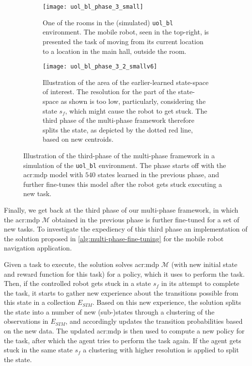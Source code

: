 \begin{figure}
	\centering
	\captionsetup{font=small}
	\captionsetup[subfigure]{font=footnotesize}
	\begin{subfigure}{0.475\textwidth}
		\centering
		\texttt{[image: uol\_bl\_phase\_3\_small]}
		\caption{One of the rooms in the (simulated) \texttt{uol\_bl} environment. The mobile robot, seen in the top-right, is presented the task of moving from its current location to a location in the main hall, outside the room.}
		\label{fig:uol_bl_tuning_1}
	\end{subfigure}
	\hfill
	\begin{subfigure}{0.475\textwidth}
		\centering
		\vspace{19.5pt}
		\texttt{[image: uol\_bl\_phase\_3\_2\_smallv6]}
		\caption{Illustration of the area of the earlier-learned state-space of interest. The resolution for the part of the state-space as shown is too low, particularly, considering the state $s_f$, which might cause the robot to get stuck. The third phase of the multi-phase framework therefore splits the state, as depicted by the dotted red line, based on new centroids.}
		\label{fig:uol_bl_tuning_2}
	\end{subfigure}
	\bigskip
	
	\caption{Illustration of the third-phase of the multi-phase framework in a simulation of the \texttt{uol\_bl} environment. The phase starts off with the \acrshort{acr:mdp} model with $540$ states learned in the previous phase, and further fine-tunes this model after the robot gets stuck executing a new task.}
	\label{fig:uol_bl_tuning}
\end{figure}

Finally, we get back at the third phase of our multi-phase framework, in which the \acrshort{acr:mdp} $\mathcal{M}$ obtained in the previous phase is further fine-tuned for a set of new tasks.
To investigate the expediency of this third phase an implementation of the solution proposed in \autoref{alg:multi-phase-fine-tuning} for the mobile robot navigation application.

Given a task to execute, the solution solves \acrshort{acr:mdp} $\mathcal{M}$ (with new initial state and reward function for this task) for a policy, which it uses to perform the task.
Then, if the controlled robot gets stuck in a state $s_f$ in its attempt to complete the task, it starts to gather new experience about the transitions possible from this state in a collection $E_\mathit{SIM}$.
Based on this new experience, the solution splits the state into a number of new (sub-)states through a clustering of the observations in $E_\mathit{SIM}$, and accordingly updates the transition probabilities based on the new data.
The updated \acrshort{acr:mdp} is then used to compute a new policy for the task, after which the agent tries to perform the task again.
If the agent gets stuck in the same state $s_f$ a clustering with higher resolution is applied to split the state.

